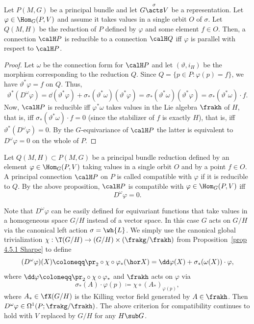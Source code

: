 \begin{prop}[{{\cite[Prop.~1.6.10]{RS2}}}]\label{prop 1.6.10 RS2}
    Let $P(M,G)$ be a principal bundle and let $G\overset{\sigma}{\acts}V$ be a representation. Let $\varphi\in\Hom_G(P,V)$ and assume it takes values in a single orbit $O$ of $\sigma$. Let $Q(M,H)$ be the reduction of $P$ defined by $\varphi$ and some element $f\in O$. Then, a connection $\calH P$ is reducible to a connection $\calH Q$ iff $\varphi$ is parallel with respect to $\calH P$.
\end{prop}
\begin{proof}
    Let $\omega$ be the connection form for $\calH P$ and let $(\vartheta,i_H)$ be the morphism corresponding to the reduction $Q$. Since $Q=\{p\in P:\varphi(p)=f\}$, we have $\vartheta^\ast \varphi=f$ on $Q$. Thus,
    \[\vartheta^\ast(D^\omega\varphi)=\dd (\vartheta^\ast \varphi)+\sigma_\ast(\vartheta^\ast\omega)(\vartheta^\ast\varphi)=\sigma_\ast(\vartheta^\ast\omega)(\vartheta^\ast\varphi)=\sigma_\ast(\vartheta^\ast\omega)\cdot f.\]
    Now, $\calH P$ is reducible iff $\varphi^\ast\omega$ takes values in the Lie algebra $\frakh$ of $H$, that is, iff $\sigma_\ast(\vartheta^\ast\omega)\cdot f=0$ (since the stabilizer of $f$ is exactly $H$), that is, iff $\vartheta^\ast(D^\omega\varphi)=0$. By the $G$-equivariance of $\calH P$ the latter is equivalent to $D^\omega \varphi=0$ on the whole of $P$.
\end{proof}


\begin{defn}\label{def compatible connection}
    Let $Q(M,H)\subset P(M,G)$ be a principal bundle reduction defined by an element $\varphi\in \Hom_G(P,V)$ taking values in a single orbit $O$ and by a point $f\in O$. A principal connection $\calH P$ on $P$ is called compatible with $\varphi$ if it is reducible to $Q$. By the above proposition, $\calH P$ is compatible with $\varphi\in\Hom_G(P,V)$ iff
    \[D^\omega\varphi=0.\]
\end{defn}

\begin{rem}\label{rem generalized covariant D}
    Note that $D^\omega \varphi$ can be easily defined for equivariant functions that take values in a homogeneous space $G\slash H$ instead of a vector space. In this case $G$ acts on $G\slash H$ via the canonical left action $\sigma=\wh{L}$. We simply use the canonical global trivialization $\chi:\T(G\slash H)\to (G\slash H)\times(\frakg\slash\frakh)$ from Proposition~\ref{prop 4.5.1 Sharpe} to define
    \[(D^\omega{\varphi})(X)\coloneqq \pr_2\circ \chi\circ \varphi_\ast(\hor X)=\dd \varphi(X)+\sigma_\ast(\omega(X))\cdot {\varphi},\]
    where $\dd \varphi\coloneqq \pr_2\circ\chi\circ \varphi_\ast $ and $\frakh$ acts on $\varphi$ via 
    \[\sigma_\ast(A)\cdot \varphi(p)\coloneqq \chi\circ (A_{\ast})_{\varphi(p)},\]
    where $A_\ast\in\fX(G\slash H)$ is the Killing vector field generated by $A\in\frakh$. Then $D^\omega {\varphi}\in \Omega^1(P;\frakg\slash\frakh)$. The above criterion for compatibility continues to hold with $V$ replaced by $G\slash H$ for any $H\sub G$.
\end{rem}






